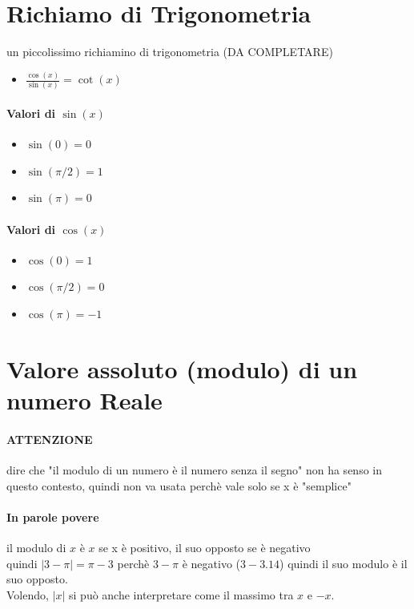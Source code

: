 \documentclass[12pt, a4paper, openany]{book}
\begin{document}
\section{Richiamo di Trigonometria}
un piccolissimo richiamino di trigonometria (DA COMPLETARE)
\begin{itemize}
	\item $\frac{\cos(x)}{\sin(x)} = \cot(x)$
\end{itemize}
\paragraph*{Valori di $\sin(x)$}
\begin{itemize}
	\item $\sin(0) = 0$
	\item $\sin(\pi/2) = 1$
	\item $\sin(\pi) = 0$
\end{itemize}
\paragraph*{Valori di $\cos(x)$}
\begin{itemize}
	\item $\cos(0) = 1$
	\item $\cos(\pi/2) = 0$
	\item $\cos(\pi) = -1$
\end{itemize}

\section{Valore assoluto (modulo) di un numero Reale}

\paragraph{ATTENZIONE} dire che "il modulo di un numero è il numero senza il segno" non ha senso in questo contesto, quindi non va usata perchè vale solo se x è "semplice"
\paragraph{In parole povere} il modulo di $x$ è $x$ se x è positivo, il suo opposto se è negativo\\
quindi $|3 - \pi| = \pi - 3$ perchè $3-\pi$ è negativo ($3 - 3.14$) quindi il suo modulo è il suo opposto.
\\Volendo, $|x|$ si può anche interpretare come il massimo tra $x$ e $-x$.
\end{document}
